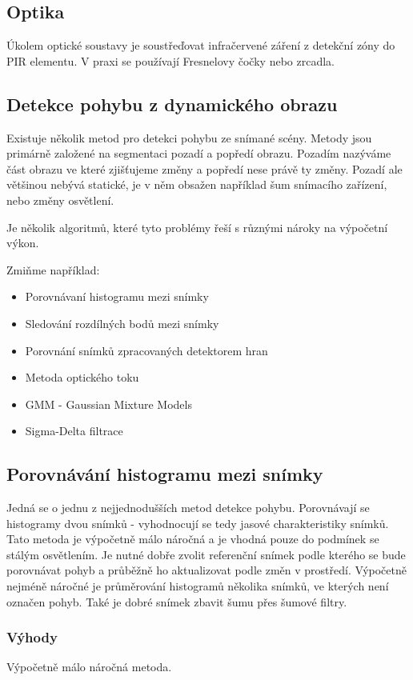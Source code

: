 \subsection*{Optika}
Úkolem optické soustavy je soustřeďovat infračervené záření z detekční zóny do PIR elementu. V praxi se používají Fresnelovy čočky nebo zrcadla.

\subsection*{Detekce pohybu z dynamického obrazu}
Existuje několik metod pro detekci pohybu ze snímané scény.
Metody jsou primárně založené na segmentaci pozadí a popředí obrazu.
Pozadím nazýváme část obrazu ve které zjišťujeme změny a popředí nese právě ty změny. Pozadí ale většinou nebývá statické, je v něm obsažen například šum snímacího zařízení, nebo změny osvětlení. 

Je několik algoritmů, které tyto problémy řeší s různými nároky na výpočetní výkon.

Zmiňme například:
\begin{itemize}
    \item
    Porovnávaní histogramu mezi snímky
    \item
    Sledování rozdílných bodů mezi snímky
    \item
    Porovnání snímků zpracovaných detektorem hran
    \item
    Metoda optického toku
    \item
    GMM - Gaussian Mixture Models
    \item
    Sigma-Delta filtrace
\end{itemize}

\subsection*{Porovnávání histogramu mezi snímky}
Jedná se o jednu z nejjednodušších metod detekce pohybu. Porovnávají se histogramy dvou snímků - vyhodnocují se tedy jasové charakteristiky snímků. Tato metoda je výpočetně málo náročná a je vhodná pouze do podmínek se stálým osvětlením. Je nutné dobře zvolit referenční snímek podle kterého se bude porovnávat pohyb a průběžně ho aktualizovat podle změn v prostředí. Výpočetně nejméně náročné je průměrování histogramů několika snímků, ve kterých není označen pohyb. Také je dobré snímek zbavit šumu přes šumové filtry. \cite{fbmi_video}

\subsubsection{Výhody} 
Výpočetně málo náročná metoda.
